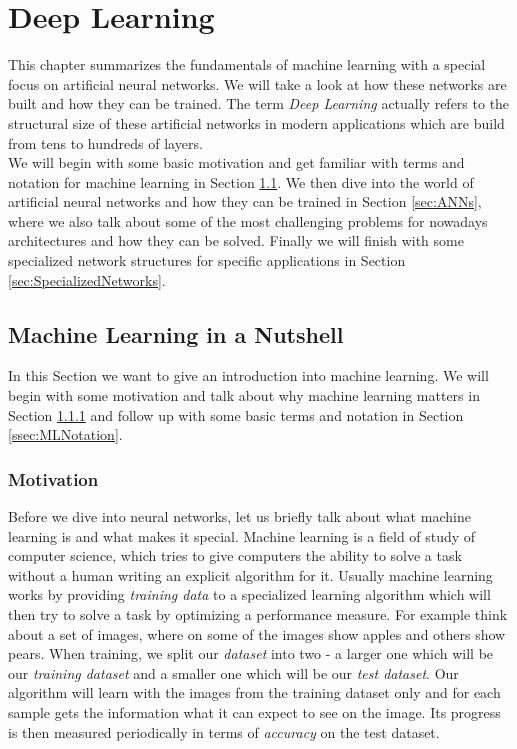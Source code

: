 \chapter{Deep Learning}
This chapter summarizes the fundamentals of machine learning with a special focus on artificial neural networks. We will take a look at how these networks are built and how they can be trained. The term \textit{Deep Learning} actually refers to the structural size of these artificial networks in modern applications which are build from tens to hundreds of layers. \\
We will begin with some basic motivation and get familiar with terms and notation for machine learning in Section \ref{ssec:MLNutshell}. We then dive into the world of artificial neural networks and how they can be trained in Section \ref{sec:ANNs}, where we also talk about some of the most challenging problems for nowadays architectures and how they can be solved. Finally we will finish with some specialized network structures for specific applications in Section \ref{sec:SpecializedNetworks}.

\section{Machine Learning in a Nutshell} \label{ssec:MLNutshell}
In this Section we want to give an introduction into machine learning. We will begin with some motivation and talk about why machine learning matters in Section \ref{ssec:MLMotivation} and follow up with some basic terms and notation in Section \ref{ssec:MLNotation}.

\subsection{Motivation} \label{ssec:MLMotivation}
Before we dive into neural networks, let us briefly talk about what machine learning is and what makes it special. Machine learning is a field of study of computer science, which tries to give computers the ability to solve a task without a human writing an explicit algorithm for it. Usually machine learning works by providing \textit{training data} to a specialized learning algorithm which will then try to solve a task by optimizing a performance measure. For example think about a set of images, where on some of the images show apples and others show pears. When training, we split our \textit{dataset} into two - a larger one which will be our \textit{training dataset} and a smaller one which will be our \textit{test dataset}. Our algorithm will learn with the images from the training dataset only and for each sample gets the information what it can expect to see on the image. Its progress is then measured periodically in terms of \textit{accuracy} on the test dataset.

